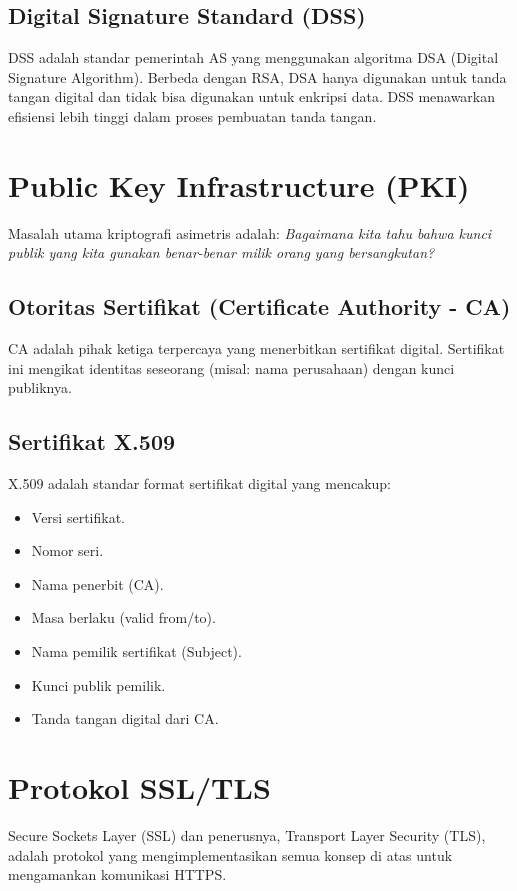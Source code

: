 \documentclass[../main.tex]{subfiles}
\begin{document}
\subsection{Digital Signature Standard (DSS)}
DSS adalah standar pemerintah AS yang menggunakan algoritma DSA (Digital Signature Algorithm). Berbeda dengan RSA, DSA hanya digunakan untuk tanda tangan digital dan tidak bisa digunakan untuk enkripsi data. DSS menawarkan efisiensi lebih tinggi dalam proses pembuatan tanda tangan.

\section{Public Key Infrastructure (PKI)}
Masalah utama kriptografi asimetris adalah: \textit{Bagaimana kita tahu bahwa kunci publik yang kita gunakan benar-benar milik orang yang bersangkutan?}

\subsection{Otoritas Sertifikat (Certificate Authority - CA)}
CA adalah pihak ketiga terpercaya yang menerbitkan sertifikat digital. Sertifikat ini mengikat identitas seseorang (misal: nama perusahaan) dengan kunci publiknya.

\subsection{Sertifikat X.509}
X.509 adalah standar format sertifikat digital yang mencakup:
\begin{itemize}
    \item Versi sertifikat.
    \item Nomor seri.
    \item Nama penerbit (CA).
    \item Masa berlaku (valid from/to).
    \item Nama pemilik sertifikat (Subject).
    \item Kunci publik pemilik.
    \item Tanda tangan digital dari CA.
\end{itemize}

\section{Protokol SSL/TLS}
Secure Sockets Layer (SSL) dan penerusnya, Transport Layer Security (TLS), adalah protokol yang mengimplementasikan semua konsep di atas untuk mengamankan komunikasi HTTPS.
\end{document}
